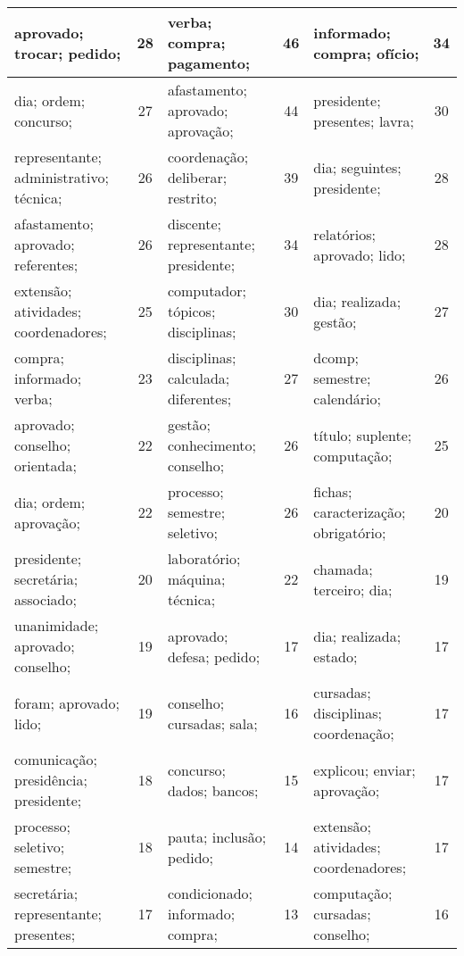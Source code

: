 \begin{table}[!h]
\begin{tabular}{|l|c||l|c||l|c|}
   aprovado; trocar; pedido; &   28  &         verba; compra; pagamento; &   46  &       informado; compra; ofício; &   34  \\ \hline
   dia; ordem; concurso; &   27  &         afastamento; aprovado; aprovação; &   44  &       presidente; presentes; lavra; &   30  \\ \hline
   representante; administrativo; técnica; &   26  &         coordenação; deliberar; restrito; &   39  &       dia; seguintes; presidente; &   28  \\ \hline
   afastamento; aprovado; referentes; &   26  &         discente; representante; presidente; &   34  &       relatórios; aprovado; lido; &   28  \\ \hline
   extensão; atividades; coordenadores; &   25  &         computador; tópicos; disciplinas; &   30  &       dia; realizada; gestão; &   27  \\ \hline
   compra; informado; verba; &   23  &         disciplinas; calculada; diferentes; &   27  &       dcomp; semestre; calendário; &   26  \\ \hline
   aprovado; conselho; orientada; &   22  &         gestão; conhecimento; conselho; &   26  &       título; suplente; computação; &   25  \\ \hline
   dia; ordem; aprovação; &   22  &         processo; semestre; seletivo; &   26  &       fichas; caracterização; obrigatório; &   20  \\ \hline
   presidente; secretária; associado; &   20  &         laboratório; máquina; técnica; &   22  &       chamada; terceiro; dia; &   19  \\ \hline
   unanimidade; aprovado; conselho; &   19  &         aprovado; defesa; pedido; &   17  &       dia; realizada; estado; &   17  \\ \hline
   foram; aprovado; lido; &   19  &         conselho; cursadas; sala; &   16  &       cursadas; disciplinas; coordenação; &   17  \\ \hline
   comunicação; presidência; presidente; &   18  &         concurso; dados; bancos; &   15  &       explicou; enviar; aprovação; &   17  \\ \hline
   processo; seletivo; semestre; &   18  &         pauta; inclusão; pedido; &   14  &       extensão; atividades; coordenadores; &   17  \\ \hline
   secretária; representante; presentes; &   17  &         condicionado; informado; compra; &   13  &       computação; cursadas; conselho; &   16  \\ \hline

\end{tabular}
\end{table}
